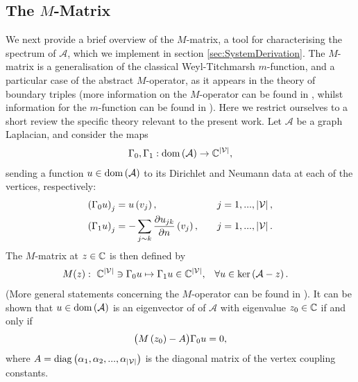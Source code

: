 \subsection{The $M$-Matrix} \label{ssec:MMatrix}
We next provide a brief overview of the $M$-matrix, a tool for characterising the spectrum of $\mathcal{A}$, which we implement in section \ref{sec:SystemDerivation}.
The $M$-matrix is a generalisation of the classical Weyl-Titchmarsh $m$-function, and a particular case of the abstract $M$-operator, as it appears in the theory of boundary triples (more information on the $M$-operator can be found in \cite{kochubei1975extensions, kochubei1980characteristic, gorbachuk1991boundary, brown2008boundary, brown2020functional, cherednichenko2020scattering, cherednichenko2018functional}, whilst information for the $m$-function can be found in \cite{titchmarsh1962eigenfunction, atkinson1964discrete}).
Here we restrict ourselves to a short review the specific theory relevant to the present work.
Let $\mathcal{A}$ be a graph Laplacian, and consider the maps
\begin{align*}
	\Gamma_0, \Gamma_1: \mathrm{dom}\left( \mathcal{A} \right) \rightarrow \mathbb{C}^{\left\lvert \mathcal{V} \right\rvert},
\end{align*}
sending a function $u\in\mathrm{dom}\left( \mathcal{A} \right)$ to its Dirichlet and Neumann data at each of the vertices, respectively:
\begin{align*}
	\left( \Gamma_0 u \right)_j &= u\left( v_j \right), \quad &j=1,...,\left\lvert \mathcal{V} \right\rvert, \\
	\left( \Gamma_1 u \right)_j &= -\sum_{j\sim k}\dfrac{\partial u_{jk}}{\partial n}\left( v_j \right), \quad &j=1,...,\left\lvert \mathcal{V} \right\rvert. 
\end{align*}
The $M$-matrix at $z\in\mathbb{C}$ is then defined by
\begin{align*}
	M(z): \ \mathbb{C}^{\left\lvert \mathcal{V} \right\rvert} \ni \Gamma_0 u \mapsto \Gamma_1 u \in \mathbb{C}^{\left\lvert \mathcal{V} \right\rvert},
	 &\quad \forall u\in\mathrm{ker}\left( \mathcal{A}-z \right).
\end{align*}
(More general statements concerning the $M$-operator can be found in \cite{derkach1991generalized, derkach2014boundary}).
It can be shown that $u\in\mathrm{dom}\left( \mathcal{A} \right)$ is an eigenvector of of $\mathcal{A}$ with eigenvalue $z_0\in\mathbb{C}$ if and only if
\begin{align*}
	\bigl( M\left( z_0 \right) - A \bigr) \Gamma_0 u = 0,
\end{align*}
 where $A = \mathrm{diag}\left( \alpha_1, \alpha_2, ... , \alpha_{\left\lvert \mathcal{V} \right\rvert} \right)$ is the diagonal matrix of the vertex coupling constants.
